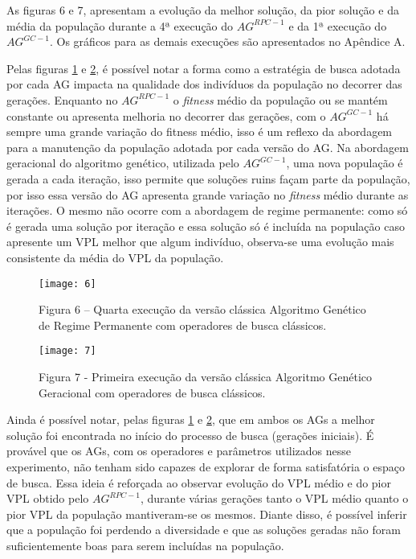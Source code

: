 As figuras 6 e 7, apresentam a evolução da melhor solução, da pior solução e da média da população durante a 4ª execução do $AG^{RPC-1}$ e da 1ª execução do $AG^{GC-1}$. Os gráficos para as demais execuções são apresentados no Apêndice A.

Pelas figuras \ref{fig:graph1_1} e \ref{fig:graph1_2}, é possível notar a forma como a estratégia de busca adotada por cada AG impacta na qualidade dos indivíduos da população no decorrer das gerações. Enquanto no $AG^{RPC-1}$ o \textit{fitness} médio da população ou se mantém constante ou apresenta melhoria no decorrer das gerações, com o $AG^{GC-1}$ há sempre uma grande variação do fitness médio, isso é um reflexo da abordagem para a manutenção da população adotada por cada versão do AG. Na abordagem geracional do algoritmo genético, utilizada pelo $AG^{GC-1}$, uma nova população é gerada a cada iteração, isso permite que soluções ruins façam parte da população, por isso essa versão do AG apresenta grande variação no \textit{fitness} médio durante as iterações. O mesmo não ocorre com a abordagem de regime permanente: como só é gerada uma solução por iteração e essa solução só é incluída na população caso apresente um VPL melhor que algum indivíduo, observa-se uma evolução mais consistente da média do VPL da população.

\begin{figure}[htb]
    \texttt{[image: 6]}
    \caption{Figura 6 – Quarta execução da versão clássica Algoritmo Genético de Regime Permanente com operadores de busca clássicos.}
    \label{fig:graph1_1}
\end{figure}

\begin{figure}[htb]
    \texttt{[image: 7]}
    \caption{Figura 7 - Primeira execução da versão clássica Algoritmo Genético Geracional com operadores de busca clássicos.}
    \label{fig:graph1_2}
\end{figure}

Ainda é possível notar, pelas figuras \ref{fig:graph1_1} e \ref{fig:graph1_2}, que em ambos os AGs a melhor solução foi encontrada no início do processo de busca (gerações iniciais). É provável que os AGs, com os operadores e parâmetros utilizados nesse experimento, não tenham sido capazes de explorar de forma satisfatória o espaço de busca. Essa ideia é reforçada ao observar evolução do VPL médio e do pior VPL obtido pelo $AG^{RPC-1}$, durante várias gerações tanto o VPL médio quanto o pior VPL da população mantiveram-se os mesmos. Diante disso, é possível inferir que a população foi perdendo a diversidade e que as soluções geradas não foram suficientemente boas para serem incluídas na população.

